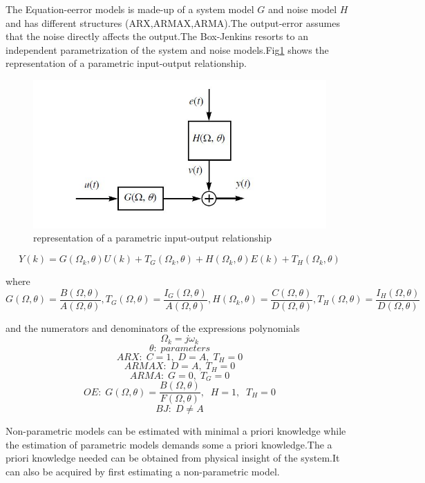 \documentclass[a4paper,12pt]{article}
\numberwithin{equation}{section}
\begin{document}
The Equation-eerror models is made-up of a system model $G$ and noise model $H$ and has different structures (ARX,ARMAX,ARMA).The output-error assumes that the noise directly affects the output.The Box-Jenkins resorts to an independent parametrization of the system and noise models.Fig\ref{fig:par_res} shows the representation of a parametric input-output relationship.

\begin{figure}[H]
    \includegraphics[scale=1]{parametric_repre.JPG}
    \centering
    \caption{representation of a parametric input-output relationship}
    \label{fig:par_res}
\end{figure}


\[Y(k)=G\left(\Omega_{k}, \theta\right) U(k)+T_{G}\left(\Omega_{k}, \theta\right)+H\left(\Omega_{k}, \theta\right) E(k)+T_{H}\left(\Omega_{k}, \theta\right)\]

\noindent
where
\[G(\Omega, \theta)=\frac{B(\Omega, \theta)}{A(\Omega, \theta)}, T_{G}(\Omega, \theta)=\frac{I_{G}(\Omega, \theta)}{A(\Omega, \theta)}, H\left(\Omega_{k}, \theta\right)=\frac{C(\Omega, \theta)}{D(\Omega, \theta)}, T_{H}(\Omega, \theta)=\frac{I_{H}(\Omega, \theta)}{D(\Omega, \theta)}\]

\noindent
and the numerators and denominators of the expressions polynomials
\[\Omega_{k}=j\omega_{k}\]
\[\theta:\;parameters\]
\[ARX:\; C=1,\; D=A,\; T_{H}=0\]
\[ARMAX:\; D=A,\; T_{H}=0 \]
\[ARMA:\; G=0,\; T_{G}=0\]
\[OE:\; G(\Omega, \theta)=\frac{B(\Omega, \theta)}{F(\Omega, \theta)},\;\;H=1 ,\;\; T_{H}=0  \]
\[BJ:\; D \neq A\]


Non-parametric models can be estimated with minimal a priori knowledge while the estimation of parametric models demands some a priori knowledge.The a priori knowledge needed can be obtained from physical insight of the system.It can also be acquired by first estimating a non-parametric model.
\end{document}
